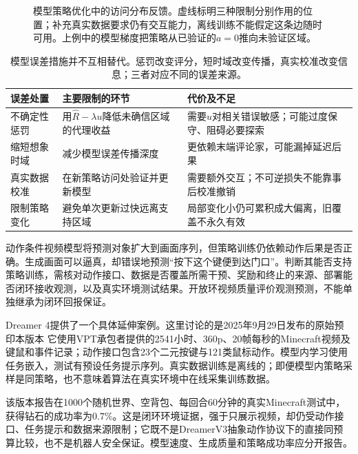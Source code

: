 \begin{figure}[t]
  \centering
  
  \caption{模型策略优化中的访问分布反馈。虚线标明三种限制分别作用的位置；补充真实数据要求仍有交互能力，离线训练不能假定这条边随时可用。上例中的模型梯度把策略从已验证的$a=0$推向未验证区域。}
  \label{fig:rl-learning-model-feedback}
\end{figure}

\begin{table}[t]
  \centering
  \small
  \begin{tabularx}{\linewidth}{>{\raggedright\arraybackslash}p{26mm} >{\raggedright\arraybackslash}X >{\raggedright\arraybackslash}X}
    \toprule
    误差处置 & 主要限制的环节 & 代价及不足 \\
    \midrule
    不确定性惩罚 & 用$\widehat R-\lambda u$降低未确信区域的代理收益 & 需要$u$对相关错误敏感；可能过度保守、阻碍必要探索 \\
    缩短想象时域 & 减少模型误差传播深度 & 更依赖末端评论家，可能漏掉延迟后果 \\
    真实数据校准 & 在新策略访问处验证并更新模型 & 需要额外交互；不可逆损失不能靠事后校准撤销 \\
    限制策略变化 & 避免单次更新过快远离支持区域 & 局部变化小仍可累积成大偏离，旧覆盖不永久有效 \\
    \bottomrule
  \end{tabularx}
  \caption{模型误差措施并不互相替代。惩罚改变评分，短时域改变传播，真实校准改变信息；三者对应不同的误差来源。}
  \label{tab:rl-learning-model-policy-errors}
\end{table}

动作条件视频模型将预测对象扩大到画面序列，但策略训练仍依赖动作后果是否正确。生成画面可以逼真，却错误地预测“按下这个键便到达门口”。判断其能否支持策略训练，需核对动作接口、数据是否覆盖所需干预、奖励和终止的来源、部署能否闭环接收观测，以及真实环境测试结果。开放环视频质量评价观测预测，不能单独继承为闭环回报保证。

Dreamer 4提供了一个具体延伸案例。这里讨论的是2025年9月29日发布的原始预印本版本
它使用VPT承包者提供的2541小时、360p、20帧每秒的Minecraft视频及键鼠和事件记录；动作接口包含23个二元按键与121类鼠标动作。模型内学习使用任务嵌入，测试有预设任务提示序列。真实数据训练是离线的；即便模型内策略采样是同策略，也不意味着算法在真实环境中在线采集训练数据。

该版本报告在1000个随机世界、空背包、每回合60分钟的真实Minecraft测试中，获得钻石的成功率为$0.7\%$。这是闭环环境证据，强于只展示视频，却仍受动作接口、任务提示和数据来源限制；它既不是DreamerV3抽象动作协议下的直接同预算比较，也不是机器人安全保证。模型速度、生成质量和策略成功率应分开报告。

